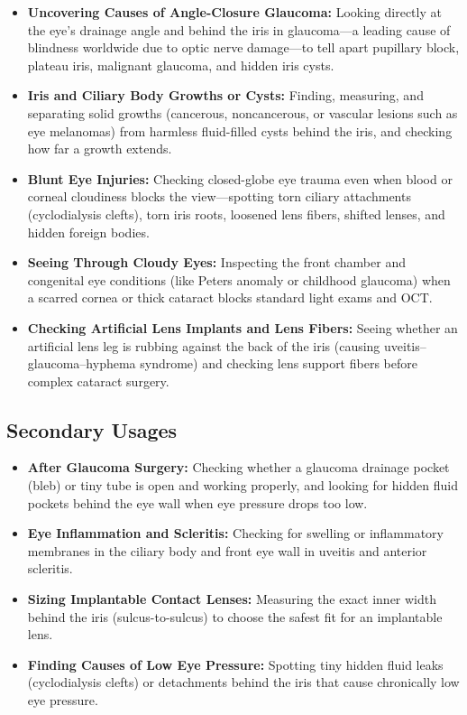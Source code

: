 \begin{itemize}
    \item \textbf{Uncovering Causes of Angle-Closure Glaucoma:} Looking directly at the eye's drainage angle and behind the iris in glaucoma---a leading cause of blindness worldwide due to optic nerve damage---to tell apart pupillary block, plateau iris, malignant glaucoma, and hidden iris cysts.
    \item \textbf{Iris and Ciliary Body Growths or Cysts:} Finding, measuring, and separating solid growths (cancerous, noncancerous, or vascular lesions such as eye melanomas) from harmless fluid-filled cysts behind the iris, and checking how far a growth extends.
    \item \textbf{Blunt Eye Injuries:} Checking closed-globe eye trauma even when blood or corneal cloudiness blocks the view---spotting torn ciliary attachments (cyclodialysis clefts), torn iris roots, loosened lens fibers, shifted lenses, and hidden foreign bodies.
    \item \textbf{Seeing Through Cloudy Eyes:} Inspecting the front chamber and congenital eye conditions (like Peters anomaly or childhood glaucoma) when a scarred cornea or thick cataract blocks standard light exams and OCT.
    \item \textbf{Checking Artificial Lens Implants and Lens Fibers:} Seeing whether an artificial lens leg is rubbing against the back of the iris (causing uveitis--glaucoma--hyphema syndrome) and checking lens support fibers before complex cataract surgery.
\end{itemize}

\subsection{Secondary Usages}

\begin{itemize}
    \item \textbf{After Glaucoma Surgery:} Checking whether a glaucoma drainage pocket (bleb) or tiny tube is open and working properly, and looking for hidden fluid pockets behind the eye wall when eye pressure drops too low.
    \item \textbf{Eye Inflammation and Scleritis:} Checking for swelling or inflammatory membranes in the ciliary body and front eye wall in uveitis and anterior scleritis.
    \item \textbf{Sizing Implantable Contact Lenses:} Measuring the exact inner width behind the iris (sulcus-to-sulcus) to choose the safest fit for an implantable lens.
    \item \textbf{Finding Causes of Low Eye Pressure:} Spotting tiny hidden fluid leaks (cyclodialysis clefts) or detachments behind the iris that cause chronically low eye pressure.
\end{itemize}

